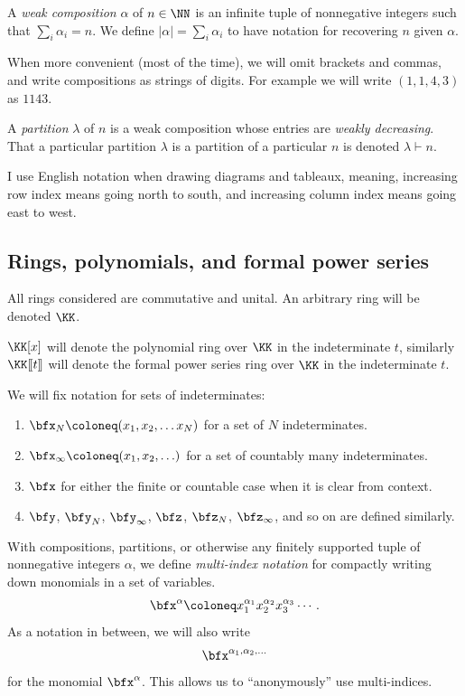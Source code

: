 \documentclass{article}
\newcommand{\lrBrack}[1]{[\kern-1.2pt[ {#1} ]\kern-1.2pt]}
\newcommand{\fps}[2]{#1 \lrBrack{#2}}
\newcommand{\pring}[2]{#1 [ {#2} ]}
\begin{document}
A \textit{weak composition} $\alpha$ of $n \in \NN$ is an infinite tuple of nonnegative integers 
such that $\sum_i \alpha_i = n$. 
We define $|\alpha| = \sum_i \alpha_i$ to have notation for recovering $n$ given $\alpha$.

When more convenient (most of the time), we will omit brackets and commas, and write compositions as strings of digits. For example we will write $(1,1,4,3)$ as $1143$.

A \textit{partition} $\lambda$ of $n$ is a weak composition whose entries are \textit{weakly decreasing}. 
That a particular partition $\lambda$ is a partition of a particular $n$ is denoted $\lambda \vdash n$. 

I use English notation when drawing diagrams and tableaux, meaning, increasing row index means going north to south, and increasing column index means going east to west.

\subsection*{Rings, polynomials, and formal power series}

All rings considered are commutative and unital. An arbitrary ring will be denoted $\KK$. 

$\pring{\KK}{x}$ will denote the polynomial ring over $\KK$ in the indeterminate $t$, similarly $\fps{\KK}{t}$ will denote the formal power series ring over $\KK$ in the indeterminate $t$.

We will fix notation for sets of indeterminates:

\begin{enumerate}[label=(\alph*)]
    \item $\bfx_N \coloneq (x_1, x_2, \ldots x_N)$ for a set of $N$ indeterminates.
    \item $\bfx_\infty \coloneq (x_1, x_2, \ldots)$ for a set of countably many indeterminates.
    \item $\bfx$ for either the finite or countable case when it is clear from context.
    \item $\bfy$, $\bfy_N$, $\bfy_\infty$, $\bfz$, $\bfz_N$, $\bfz_\infty$, and so on are defined similarly.
\end{enumerate}

With compositions, partitions, or otherwise any finitely supported tuple of nonnegative integers $\alpha$, we define \textit{multi-index notation} for compactly writing down monomials in a set of variables.
\[
    \bfx^\alpha
    \coloneq
    x_1^{\alpha_1}x_2^{\alpha_2}x_3^{\alpha_3}\cdots.
\]
As a notation in between, we will also write
\[
    \bfx^{\alpha_1,\alpha_2,\ldots}
\]
for the monomial $\bfx^\alpha$.
This allows us to ``anonymously'' use multi-indices.
\end{document}
